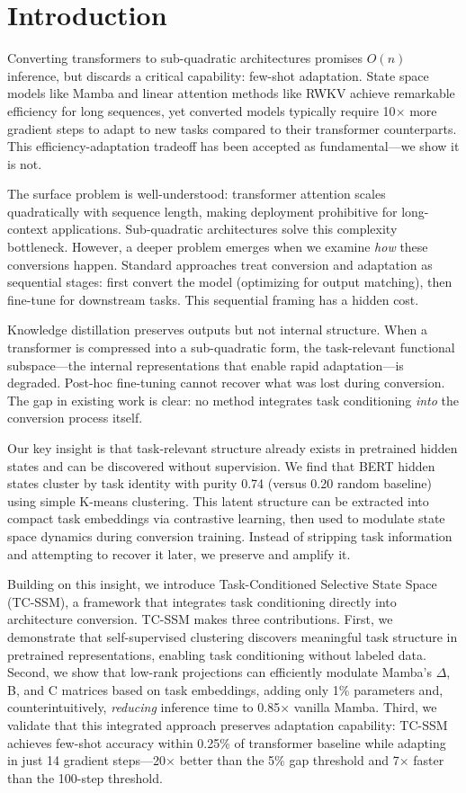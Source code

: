 \section{Introduction}

Converting transformers to sub-quadratic architectures promises $O(n)$ inference, but discards a critical capability: few-shot adaptation. State space models like Mamba and linear attention methods like RWKV achieve remarkable efficiency for long sequences, yet converted models typically require 10$\times$ more gradient steps to adapt to new tasks compared to their transformer counterparts. This efficiency-adaptation tradeoff has been accepted as fundamental---we show it is not.

The surface problem is well-understood: transformer attention scales quadratically with sequence length, making deployment prohibitive for long-context applications. Sub-quadratic architectures solve this complexity bottleneck. However, a deeper problem emerges when we examine \textit{how} these conversions happen. Standard approaches treat conversion and adaptation as sequential stages: first convert the model (optimizing for output matching), then fine-tune for downstream tasks. This sequential framing has a hidden cost.

Knowledge distillation preserves outputs but not internal structure. When a transformer is compressed into a sub-quadratic form, the task-relevant functional subspace---the internal representations that enable rapid adaptation---is degraded. Post-hoc fine-tuning cannot recover what was lost during conversion. The gap in existing work is clear: no method integrates task conditioning \textit{into} the conversion process itself.

Our key insight is that task-relevant structure already exists in pretrained hidden states and can be discovered without supervision. We find that BERT hidden states cluster by task identity with purity 0.74 (versus 0.20 random baseline) using simple K-means clustering. This latent structure can be extracted into compact task embeddings via contrastive learning, then used to modulate state space dynamics during conversion training. Instead of stripping task information and attempting to recover it later, we preserve and amplify it.

Building on this insight, we introduce Task-Conditioned Selective State Space (TC-SSM), a framework that integrates task conditioning directly into architecture conversion. TC-SSM makes three contributions. First, we demonstrate that self-supervised clustering discovers meaningful task structure in pretrained representations, enabling task conditioning without labeled data. Second, we show that low-rank projections can efficiently modulate Mamba's $\Delta$, B, and C matrices based on task embeddings, adding only 1\% parameters and, counterintuitively, \textit{reducing} inference time to 0.85$\times$ vanilla Mamba. Third, we validate that this integrated approach preserves adaptation capability: TC-SSM achieves few-shot accuracy within 0.25\% of transformer baseline while adapting in just 14 gradient steps---20$\times$ better than the 5\% gap threshold and 7$\times$ faster than the 100-step threshold.

